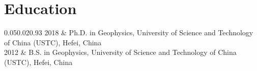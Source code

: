 \section{Education}

\begin{EntriesTable}{0.05}{0.02}{0.93}
2018 & Ph.D. in Geophysics, University of Science and Technology of China (USTC), Hefei, China \\
2012 & B.S. in Geophysics, University of Science and Technology of China (USTC), Hefei, China \\
\end{EntriesTable}
